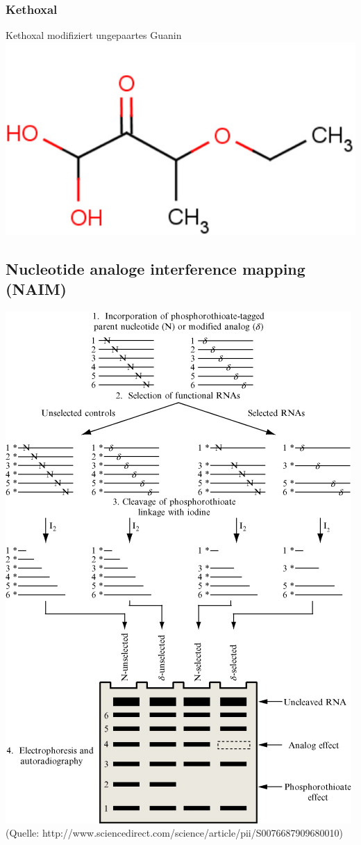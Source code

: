 \subsubsection{Kethoxal}
Kethoxal modifiziert ungepaartes Guanin \\
\includegraphics[scale=0.3]{lectures/160527/pix/Kethoxal.jpg}

\subsection{Nucleotide analoge interference mapping (NAIM)}
\includegraphics[scale=0.7]{lectures/160527/pix/NAIM.jpg} \\
(Quelle: http://www.sciencedirect.com/science/article/pii/S0076687909680010) \\
 
